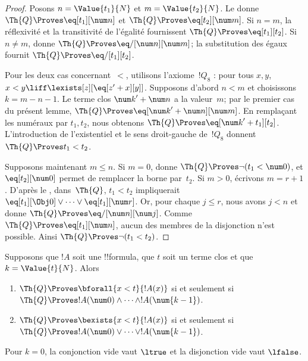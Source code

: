 \documentclass[../../../include/open-logic-section]{subfiles}
\begin{document}
\begin{proof}
Posons $n=\Value{t_1}{N}$ et $m=\Value{t_2}{N}$.
Le  donne
$\Th{Q}\Proves\eq[t_1][\num n]$ et
$\Th{Q}\Proves\eq[t_2][\num m]$.
Si $n=m$, la réflexivité et la transitivité de l'égalité
fournissent $\Th{Q}\Proves\eq[t_1][t_2]$.
Si $n\neq m$, 
donne $\Th{Q}\Proves\eq/[\num n][\num m]$;
la substitution des égaux fournit
$\Th{Q}\Proves\eq/[t_1][t_2]$.

Pour les deux cas concernant~$<$, utilisons l'axiome~$!Q_8$ :
pour tous $x,y$,
$x<y\liff\lexists[z][\eq[z'+x][y]]$.
Supposons d'abord $n<m$ et choisissons
$k=m-n-1$. Le terme clos ${\num k}'+\num n$ a la
valeur~$m$; par le premier cas du présent lemme,
$\Th{Q}\Proves\eq[{\num k}'+\num n][\num m]$.
En remplaçant les numéraux par $t_1,t_2$, nous obtenons
$\Th{Q}\Proves\eq[{\num k}'+t_1][t_2]$.
L'introduction de l'existentiel et le sens droit-gauche
de~$!Q_8$ donnent $\Th{Q}\Proves t_1<t_2$.

Supposons maintenant $m\leq n$. Si $m=0$,
 donne
$\Th{Q}\Proves\lnot(t_1<\num 0)$, et
$\eq[t_2][\num 0]$ permet de remplacer la borne par~$t_2$.
Si $m>0$, écrivons $m=r+1$. D'après le
, dans~$\Th{Q}$,
$t_1<t_2$ impliquerait
$\eq[t_1][\Obj 0]\lor\dots\lor\eq[t_1][\num r]$.
Or, pour chaque $j\leq r$, nous avons $j<n$ et
 donne
$\Th{Q}\Proves\eq/[\num n][\num j]$.
Comme $\Th{Q}\Proves\eq[t_1][\num n]$, aucun des
membres de la disjonction n'est possible. Ainsi
$\Th{Q}\Proves\lnot(t_1<t_2)$.
\end{proof}

\begin{lem}
Supposons que $!A$ soit une !!{formula}, que $t$ soit un
terme clos et que $k=\Value{t}{N}$. Alors
\begin{enumerate}
\item $\Th{Q}\Proves\bforall{x<t}{!A(x)}$ si et seulement si
      $\Th{Q}\Proves !A(\num 0)\land\dots\land
      !A(\num{k-1})$.
\item $\Th{Q}\Proves\bexists{x<t}{!A(x)}$ si et seulement si
      $\Th{Q}\Proves !A(\num 0)\lor\dots\lor
      !A(\num{k-1})$.
\end{enumerate}
Pour $k=0$, la conjonction vide vaut $\ltrue$ et la
disjonction vide vaut $\lfalse$.
\end{lem}
\end{document}
